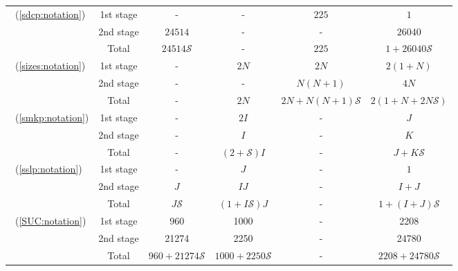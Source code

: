 \begin{table}[H]
{\begin{threeparttable}
\begin{tabular}{@{}lccccc@{}}
				\multirow{3}{*}{\sdcp\ (\ref{sdcp:notation})}  & 1st stage & -              & -                               & $225$                  & $1$                  \\
				& 2nd stage & $24514$              & -                                  & -             & $26040$                     \\ \cmidrule(l){2-6} 
				& Total          & $24514\mathcal{S}$              & -                               & $225$ & $1+26040\mathcal{S}$    \\ \midrule
				\multirow{3}{*}{\sizes\ (\ref{sizes:notation})}  & 1st stage & -              & $2N$                               & $2N$                 & $2(1+N)$                  \\
				& 2nd stage & -              & -                                  & $N(N+1)$              & $4N$                     \\ \cmidrule(l){2-6} 
				& Total          & -              & $2N$                               & $2N+N(N+1)\mathcal{S}$ & $2(1+N+2N\mathcal{S})$    \\ \midrule
				\multirow{3}{*}{\smkp\ (\ref{smkp:notation})}   & 1st stage & -              & $2I$                               & -                    & $J$                       \\
				& 2nd stage & -              & $I$                                & -                    & $K$                       \\ \cmidrule(l){2-6} 
				& Total          & -              & $(2+\mathcal{S})I$                 & -                    & $J+K\mathcal{S}$          \\ \midrule
				\multirow{3}{*}{\sslp\ (\ref{sslp:notation})}   & 1st stage & -              & $J$                                & -                    & $1$                       \\
				& 2nd stage & $J$            & $IJ$                               & -                    & $I+J$                     \\ \cmidrule(l){2-6} 
				& Total          & $J\mathcal{S}$ & $(1+I\mathcal{S})J$                & -                    & $1+(I+J)\mathcal{S}$      \\ \midrule
				\multirow{3}{*}{\suc\ (\ref{SUC:notation})}   & 1st stage & 960               &   1000                                 &     -                 &  2208                         \\
				& 2nd stage & 21274               &     2250                               &   -                   & 24780                          \\ \cmidrule(l){2-6} 
				& Total          & $960+21274\mathcal{S}$                &  $1000+2250\mathcal{S}$                                  &  -                    &  $2208+24780\mathcal{S}$                         \\ \bottomrule
			\end{tabular}
			

\end{threeparttable}}
\end{table}
